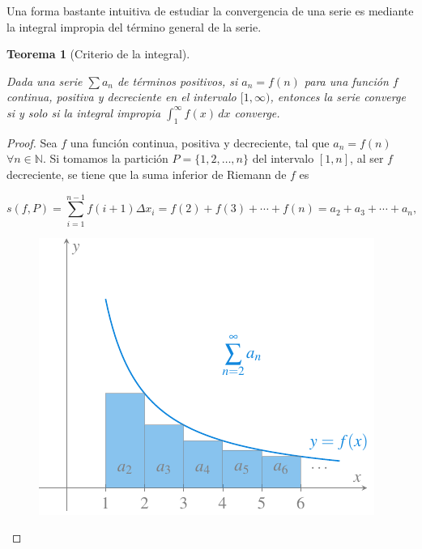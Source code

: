 \documentclass[
  a4paper,
]{scrreport}
\theoremstyle{definition}
\theoremstyle{plain}
\theoremstyle{definition}
\theoremstyle{definition}
\theoremstyle{plain}
\newtheorem{theorem}{Teorema}[chapter]
\theoremstyle{plain}
\theoremstyle{remark}
\begin{document}
Una forma bastante intuitiva de estudiar la convergencia de una serie es
mediante la integral impropia del término general de la serie.

\begin{theorem}[Criterio de la
integral]\protect\hypertarget{thm-criterio-integral}{}\label{thm-criterio-integral}

Dada una serie \(\sum a_n\) de términos positivos, si \(a_n=f(n)\) para
una función \(f\) continua, positiva y decreciente en el intervalo
\([1,\infty)\), entonces la serie converge si y solo si la integral
impropia \(\int_1^\infty f(x)\,dx\) converge.

\end{theorem}

\begin{tcolorbox}[enhanced jigsaw, leftrule=.75mm, colbacktitle=quarto-callout-note-color!10!white, toprule=.15mm, opacityback=0, opacitybacktitle=0.6, toptitle=1mm, breakable, bottomtitle=1mm, colframe=quarto-callout-note-color-frame, rightrule=.15mm, titlerule=0mm, title=\textcolor{quarto-callout-note-color}{\faInfo}\hspace{0.5em}{Demostración}, arc=.35mm, left=2mm, bottomrule=.15mm, colback=white, coltitle=black]

\begin{proof}
Sea \(f\) una función continua, positiva y decreciente, tal que
\(a_n=f(n)\) \(\forall n\in\mathbb{N}\). Si tomamos la partición
\(P=\{1,2,\ldots,n\}\) del intervalo \([1,n]\), al ser \(f\)
decreciente, se tiene que la suma inferior de Riemann de \(f\) es

\[
s(f,P) = \sum_{i=1}^{n-1} f(i+1)\Delta x_i = f(2)+f(3)+\cdots+f(n) = a_2+a_3+\cdots+a_n,
\]

\begin{figure}[H]

{\centering \includegraphics{img/series/integral-cota-superior-serie.pdf}

}
\end{figure}
\end{proof}
\end{tcolorbox}
\end{document}
